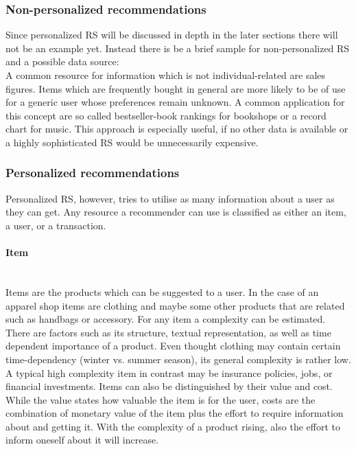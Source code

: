 \subsubsection{Non-personalized recommendations}
Since personalized RS will be discussed in depth in the later sections there will not be an example yet.
Instead there is be a brief sample for non-personalized RS and a possible data source:
\\
A common resource for information which is not individual-related are sales figures.
Items which are frequently bought in general are more likely to be of use for a generic user whose preferences remain unknown.
\citep[p.~10-11]{ricci:2011}
A common application for this concept are so called bestseller-book rankings for bookshops or a record chart for music.
This approach is especially useful, if no other data is available or a highly sophisticated RS would be unnecessarily expensive.

\subsubsection{Personalized recommendations}
Personalized RS, however, tries to utilise as many information about a user as they can get.
Any resource a recommender can use is classified as either an item, a user, or a transaction.

\paragraph{Item}\hfill\\
Items are the products which can be suggested to a user.
In the case of an apparel shop items are clothing and maybe some other products that are related such as handbags or accessory.
For any item a complexity can be estimated.
There are factors such as its structure, textual representation, as well as time dependent importance of a product.
Even thought clothing may contain certain time-dependency (winter vs. summer season), its general complexity is rather low.
A typical high complexity item in contrast may be insurance policies, jobs, or financial investments.
Items can also be distinguished by their value and cost.
While the value states how valuable the item is for the user, costs are the combination of monetary value of the item plus the effort to require information about and getting it.
With the complexity of a product rising, also the effort to inform oneself about it will increase.
\citep[p.~8]{ricci:2011}

